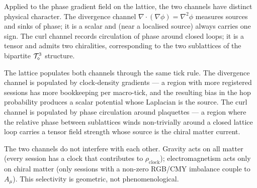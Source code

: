 Applied to the phase gradient field on the lattice, the two channels
have distinct physical character.
The divergence channel
$\nabla\cdot(\nabla\phi) = \nabla^2\phi$ measures sources and sinks of
phase; it is a scalar and (near a localised source) always carries one
sign. The curl channel records circulation of phase around closed
loops; it is a tensor and admits two chiralities, corresponding to
the two sublattices of the bipartite $\mathcal{T}_\diamond^3$ structure.

The lattice populates both channels through the same tick rule. The
divergence channel is populated by clock-density gradients --- a
region with more registered sessions has more bookkeeping per
macro-tick, and the resulting bias in the hop probability produces a
scalar potential whose Laplacian is the source. The curl channel is
populated by phase circulation around plaquettes --- a region where
the relative phase between sublattices winds non-trivially around a
closed lattice loop carries a tensor field strength whose source is
the chiral matter current.

The two channels do not interfere with each other. Gravity acts on
all matter (every session has a clock that contributes to
$\rho_\text{clock}$); electromagnetism acts only on chiral matter
(only sessions with a non-zero RGB/CMY imbalance couple to $A_\mu$).
This selectivity is geometric, not phenomenological.

